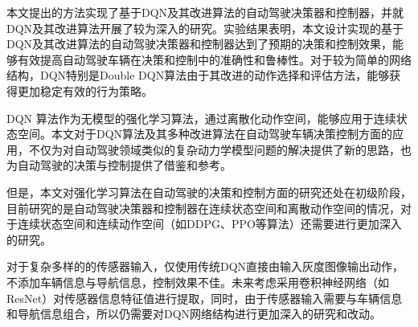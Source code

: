 %
%
%
%
%
%

\renewcommand{\thechapter}{结论}



本文提出的方法实现了基于DQN及其改进算法的自动驾驶决策器和控制器，并就DQN及其改进算法开展了较为深入的研究。实验结果表明，本文设计实现的基于DQN及其改进算法的自动驾驶决策器和控制器达到了预期的决策和控制效果，能够有效提高自动驾驶车辆在决策和控制中的准确性和鲁棒性。对于较为简单的网络结构，DQN特别是Double DQN算法由于其改进的动作选择和评估方法，能够获得更加稳定有效的行为策略。

DQN 算法作为无模型的强化学习算法，通过离散化动作空间，能够应用于连续状态空间。本文对于DQN算法及其多种改进算法在自动驾驶车辆决策控制方面的应用，不仅为对自动驾驶领域类似的复杂动力学模型问题的解决提供了新的思路，也为自动驾驶的决策与控制提供了借鉴和参考。

但是，本文对强化学习算法在自动驾驶的决策和控制方面的研究还处在初级阶段，目前研究的是自动驾驶决策器和控制器在连续状态空间和离散动作空间的情况，对于连续状态空间和连续动作空间（如DDPG、PPO等算法）还需要进行更加深入的研究。

对于复杂多样的的传感器输入，仅使用传统DQN直接由输入灰度图像输出动作，不添加车辆信息与导航信息，控制效果不佳。未来考虑采用卷积神经网络（如ResNet\cite{targ2016resnet}）对传感器信息特征值进行提取，同时，由于传感器输入需要与车辆信息和导航信息组合，所以仍需要对DQN网络结构进行更加深入的研究和改动。
